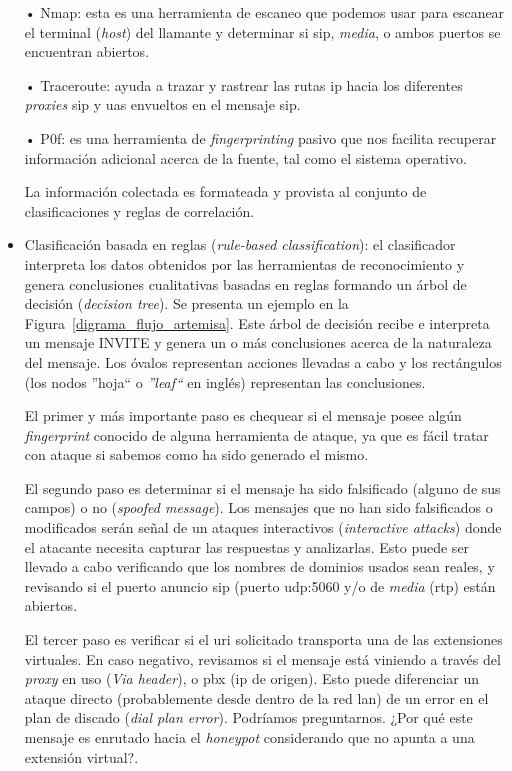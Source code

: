 \documentclass[a4paper,12pt]{report}
\begin{document}
\begin{itemize}
• Nmap: esta es una herramienta de escaneo que podemos usar para
escanear el terminal (\emph{host}) del llamante y determinar si \ac{sip}, \emph{media}, o ambos
puertos se encuentran abiertos.  

• Traceroute: ayuda a trazar y rastrear las rutas \ac{ip} hacia los
diferentes \emph{proxies} \ac{sip} y \ac{ua}s envueltos en el mensaje \ac{sip}.

• P0f: es una herramienta de \emph{fingerprinting} pasivo que nos facilita
recuperar información adicional acerca de la fuente, tal como el sistema
operativo. 

La información colectada es formateada y provista al conjunto de
clasificaciones y reglas de correlación. 

\item Clasificación basada en reglas (\emph{rule-based classification}):
el clasificador interpreta los datos obtenidos por las herramientas de
reconocimiento y genera conclusiones cualitativas basadas en reglas formando un
árbol de decisión (\emph{decision tree}). Se presenta un ejemplo en la
Figura~\ref{digrama_flujo_artemisa}. Este árbol de decisión recibe e interpreta un mensaje
INVITE y genera un o más conclusiones acerca de la naturaleza del mensaje. Los
óvalos representan acciones llevadas a cabo y los rectángulos (los nodos
''hoja`` o \emph{''leaf``} en inglés) representan las conclusiones.

El primer y más importante paso es chequear si el mensaje posee algún
\emph{fingerprint} conocido de alguna herramienta de ataque, ya que es fácil tratar con
ataque si sabemos como ha sido generado el mismo. 

El segundo paso es determinar si el mensaje ha sido falsificado (alguno de sus
campos) o no (\emph{spoofed message}). Los mensajes que no han sido
falsificados o modificados serán señal de un ataques interactivos
(\emph{interactive attacks}) donde el atacante necesita capturar las respuestas
y analizarlas. Esto puede ser llevado a cabo verificando que los nombres de
dominios usados sean reales, y revisando si el puerto anuncio \ac{sip} (puerto
\ac{udp}:5060 y/o de \emph{media} (\ac{rtp}) están abiertos. 

El tercer paso es verificar si el \ac{uri} solicitado transporta una de las
extensiones virtuales. En caso negativo, revisamos si el mensaje está viniendo
a través del \emph{proxy} en uso (\emph{Via header}), o \ac{pbx} (\ac{ip} de origen). Esto
puede diferenciar un ataque directo (probablemente desde dentro de la red \ac{lan})
de un error en el plan de discado (\emph{dial plan error}). Podríamos
preguntarnos. ¿Por qué este mensaje es enrutado hacia el \emph{honeypot} considerando
que no apunta a una extensión virtual?.


\end{itemize}
\end{document}
